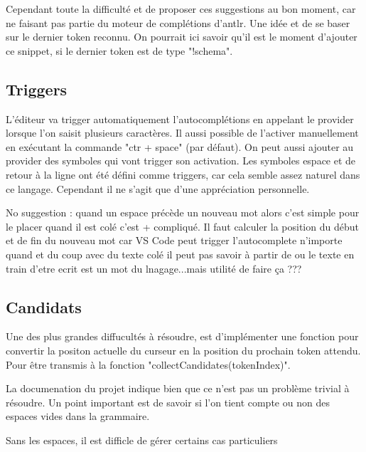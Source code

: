 \documentclass[
    iict, %
    il, %
]{heig-tb}
\begin{document}
Cependant toute la difficulté et de proposer ces suggestions au bon moment, car ne faisant pas partie du moteur de complétions d'antlr. Une idée et de se baser sur le dernier token reconnu. On pourrait ici savoir qu'il est le moment d'ajouter ce snippet, si le dernier token est de type "!schema".

\subsection{Triggers}
L'éditeur va trigger automatiquement l'autocomplétions en appelant le provider lorsque l'on saisit plusieurs caractères. Il aussi possible de l'activer manuellement en exécutant la commande "ctr + space" (par défaut).
On peut aussi ajouter au provider des symboles qui vont trigger son activation. Les symboles espace et de retour à la ligne ont été défini comme triggers, car cela semble assez naturel dans ce langage. Cependant il ne s'agit que d'une appréciation personnelle.

No suggestion :
quand un espace précède un nouveau mot alors c'est simple pour le placer
quand il est colé c'est + compliqué. Il faut calculer la position du début et de fin du nouveau mot car VS Code peut trigger l'autocomplete n'importe quand et du coup
avec du texte colé il peut pas savoir à partir de ou le texte en train d'etre ecrit est un mot du lnagage...mais utilité de faire ça ???


\subsection{Candidats}\label{candidates}

Une des plus grandes diffucultés à résoudre, est d'implémenter une fonction pour convertir la positon actuelle du curseur en la position du prochain token attendu.
Pour être transmis à la fonction "collectCandidates(tokenIndex)". %

La documenation du projet indique bien que ce n'est pas un problème trivial à résoudre.
Un point important est de savoir si l'on tient compte ou non des espaces vides dans la grammaire.

Sans les espaces, il est difficle de gérer certains cas particuliers %

\end{document}
